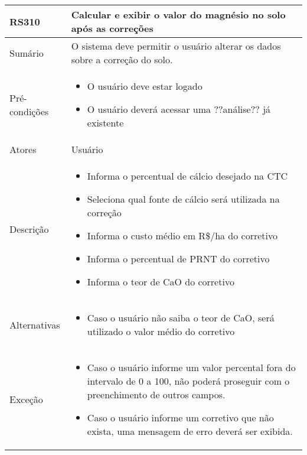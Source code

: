 \begin{quadro}[!htb]
    \begin{tabular}{|p{3cm}|p{11cm}|}
        \hline
        \textbf{RS310} & \textbf{Calcular e exibir o valor do magnésio no solo após as correções} \\
        \hline
        Sumário        & O sistema deve permitir o usuário alterar os dados sobre a correção do solo.                  \\
        \hline
        Pré-condições  & \begin{itemize}
            \item O usuário deve estar logado
            \item O usuário deverá acessar uma ??análise?? já existente 
        \end{itemize}                 \\
        \hline
        Atores         & Usuário                  \\
        \hline
        Descrição      &
        \begin{itemize}
            \item Informa o percentual de cálcio desejado na CTC
            \item Seleciona qual fonte de cálcio será utilizada na correção
            \item Informa o custo médio em R\$/ha do corretivo
            \item Informa o percentual de PRNT do corretivo
            \item Informa o teor de CaO do corretivo
        \end{itemize}                 \\
        \hline
        Alternativas   &
        \begin{itemize}
            \item Caso o usuário não saiba o teor de CaO, será utilizado o valor médio do corretivo
        \end{itemize}                 \\
        \hline
        Exceção        &
        \begin{itemize}
            \item Caso o usuário informe um valor percental fora do intervalo de 0 a 100, não poderá proseguir com o preenchimento de outros campos.
            \item Caso o usuário informe um corretivo que não exista, uma mensagem de erro deverá ser exibida.
        \end{itemize}                   \\
        \hline
    \end{tabular}
\end{quadro}

